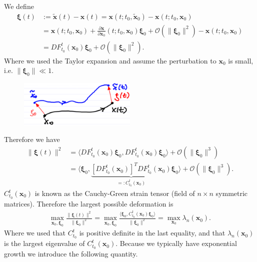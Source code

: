 \begin{ex}
	We define 
	\begin{align}
		 \bm{\xi}(t) &:= \tilde{ \bm{x}}(t) -  \bm{x}(t) =  \textbf{x}(t; t_0, \tilde{ \textbf{x}}_0) -  \textbf{x}(t; t_0,  \textbf{x}_0)\\
		       &=  \textbf{x}(t; t_0,  \textbf{x}_0) + \frac{\partial  \textbf{x}}{\partial  \textbf{x}_0}(t; t_0,  \textbf{x}_0) \bm{\xi}_0 + \mathcal{O}( \| \bm{\xi}_0 \|^2) -  \textbf{x}(t; t_0,  \textbf{x}_0) \\
		       &= DF_{t_0}^{t}( \textbf{x}_0) \bm{\xi}_0 + \mathcal{O}( \| \bm{\xi}_0 \|^2).
	\end{align}
	Where we used the Taylor expansion and assume the perturbation to $ \textbf{x}_0$ is small, i.e. $ \| \bm{\xi}_0 \| \ll 1$.
	\begin{figure}[h!]
		\centering
		\includegraphics[width=0.5\textwidth]{figures/ch1/8dispersion.png}
	\end{figure}
	Therefore we have
	\begin{align}
		 \| \bm{\xi}(t) \|^2 &= \langle DF_{t_0}^{t}( \textbf{x}_0)  \bm{\xi}_0, DF_{t_0}^{t}( \textbf{x}_0) \bm{\xi}_0 \rangle + \mathcal{O}( \| \bm{\xi}_0 \|^3) \\
			   &= \langle  \bm{\xi}_0, \underbrace{\left[ DF_{t_0}^{t}( \textbf{x}_0) \right]^T DF_{t_0}^{t}( \textbf{x}_0)}_{=: C_{t_0}^{t}( \textbf{x}_0)}  \bm{\xi}_0 \rangle + \mathcal{O}( \| \bm{\xi}_0 \|^3).
	\end{align}
	$C_{t_0}^{t}( \textbf{x}_0)$ is known as the Cauchy-Green strain tensor (field of $n\times n$ symmetric matrices).
	Therefore the largest possible deformation is
	\begin{align}
		\max_{ \textbf{x}_0, \bm{\xi}_0} \frac{ \| \bm{\xi}(t) \|^2}{ \| \bm{\xi}_0 \|^2} = \max_{ \textbf{x}_0,  \bm{\xi}_0}\frac{\langle  \bm{\xi}_0, C_{t_0}^{t}( \textbf{x}_0)  \bm{\xi}_0 \rangle}{ \| \bm{\xi}_0 \|^2} = \max_{ \textbf{x}_0} \lambda_{n}( \textbf{x}_0).
	\end{align}
	Where we used that $C_{t_0}^{t}$ is positive definite in the last equality, and that $\lambda_n( \textbf{x}_0)$ is the largest eigenvalue of $C_{t_0}^{t}( \textbf{x}_0)$. Because we typically have exponential growth we introduce the following quantity.	
\end{ex}
